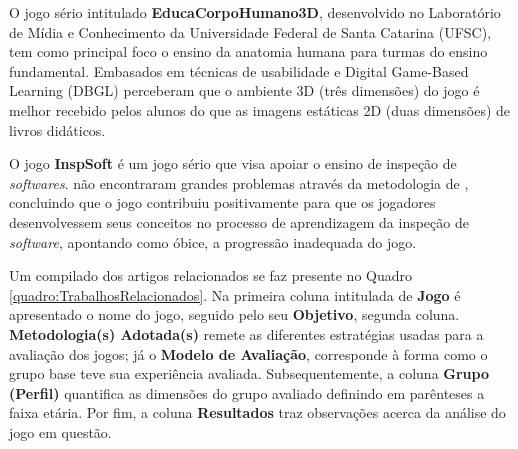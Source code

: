 \documentclass[alpha-refs,brazilian]{RBCA_v2.0}
\begin{document}
O jogo sério intitulado \textbf{EducaCorpoHumano3D}, desenvolvido no Laboratório de Mídia e Conhecimento da Universidade Federal de Santa Catarina (UFSC), tem como principal foco o ensino da anatomia humana para turmas do ensino fundamental. Embasados em técnicas de usabilidade e Digital Game-Based Learning (DBGL) \cite{rombaldi2016educacorpohumano3d} perceberam que o ambiente 3D (três dimensões) do jogo é melhor recebido pelos alunos do que as imagens estáticas 2D (duas dimensões) de livros didáticos.

O jogo \textbf{InspSoft} é um jogo sério que visa apoiar o ensino de inspeção de \textit{softwares}. \cite{lopes2012avaliaccao} não encontraram grandes problemas através da metodologia de \cite{savi2011model}, concluindo que o jogo contribuiu positivamente para que os jogadores desenvolvessem seus conceitos no processo de aprendizagem da inspeção de \textit{software}, apontando como óbice, a progressão inadequada do jogo.


Um compilado dos artigos relacionados se faz presente no Quadro \ref{quadro:TrabalhosRelacionados}. Na primeira coluna intitulada de \textbf{Jogo} é apresentado o nome do jogo, seguido pelo seu \textbf{Objetivo}, segunda coluna. \textbf{Metodologia(s) Adotada(s)} remete as diferentes estratégias usadas para a avaliação dos jogos; já o \textbf{Modelo de Avaliação}, corresponde à forma como o grupo base teve sua experiência avaliada. Subsequentemente, a coluna \textbf{Grupo (Perfil)} quantifica as dimensões do grupo avaliado definindo em parênteses a faixa etária. Por fim, a coluna \textbf{Resultados} traz observações acerca da análise do jogo em questão.
\end{document}
